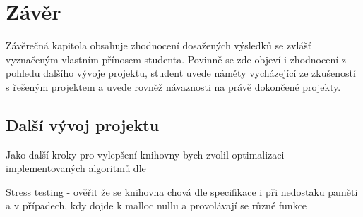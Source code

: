
\chapter{Závěr}
Závěrečná kapitola obsahuje zhodnocení dosažených výsledků se zvlášť vyznačeným vlastním přínosem studenta. Povinně se zde objeví i zhodnocení z pohledu dalšího vývoje projektu, student uvede náměty vycházející ze zkušeností s řešeným projektem a uvede rovněž návaznosti na právě dokončené projekty.

\section{Další vývoj projektu}

Jako další kroky pro vylepšení knihovny bych zvolil optimalizaci implementovaných algoritmů dle

Stress testing
- ověřit že se knihovna chová dle specifikace i při nedostaku paměti a v případech, kdy dojde k malloc nullu
a provolávají se různé funkce

